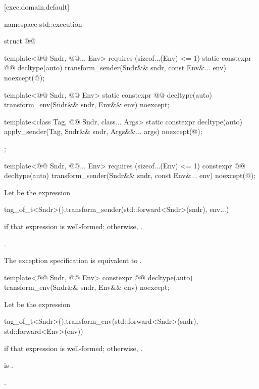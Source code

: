 [exec.domain.default]{}

\pnum
\begin{codeblock}
namespace std::execution {
  struct @@ {
    template<@@ Sndr, @@... Env>
        requires (sizeof...(Env) <= 1)
      static constexpr @@ decltype(auto) transform_sender(Sndr&& sndr, const Env&... env)
        noexcept(@\seebelow@);

    template<@@ Sndr, @@ Env>
      static constexpr @@ decltype(auto) transform_env(Sndr&& sndr, Env&& env) noexcept;

    template<class Tag, @@ Sndr, class... Args>
      static constexpr decltype(auto) apply_sender(Tag, Sndr&& sndr, Args&&... args)
        noexcept(@\seebelow@);
  };
}
\end{codeblock}

%
\begin{itemdecl}
template<@@ Sndr, @@... Env>
  requires (sizeof...(Env) <= 1)
constexpr @@ decltype(auto) transform_sender(Sndr&& sndr, const Env&... env)
  noexcept(@\seebelow@);
\end{itemdecl}

\begin{itemdescr}
\pnum
Let  be the expression
\begin{codeblock}
tag_of_t<Sndr>().transform_sender(std::forward<Sndr>(sndr), env...)
\end{codeblock}
if that expression is well-formed;
otherwise, .

\pnum
\returns
{}.

\pnum
\remarks
The exception specification is equivalent to .
\end{itemdescr}

%
\begin{itemdecl}
template<@@ Sndr, @@ Env>
  constexpr @@ decltype(auto) transform_env(Sndr&& sndr, Env&& env) noexcept;
\end{itemdecl}

\begin{itemdescr}
\pnum
Let  be the expression
\begin{codeblock}
tag_of_t<Sndr>().transform_env(std::forward<Sndr>(sndr), std::forward<Env>(env))
\end{codeblock}
if that expression is well-formed;
otherwise, .

\pnum
\mandates
{} is .

\pnum
\returns
{}.
\end{itemdescr}

